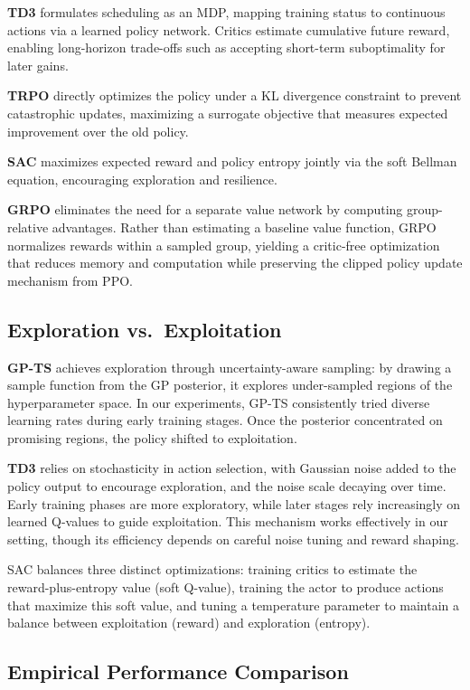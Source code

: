 \documentclass[11pt]{article}
\begin{document}
\textbf{TD3} formulates scheduling as an MDP, mapping training status to continuous actions via a learned policy network. Critics estimate cumulative future reward, enabling long-horizon trade-offs such as accepting short-term suboptimality for later gains.

\textbf{TRPO} directly optimizes the policy under a KL divergence constraint to prevent catastrophic updates, maximizing a surrogate objective that measures expected improvement over the old policy.

\textbf{SAC} maximizes expected reward and policy entropy jointly via the soft Bellman equation, encouraging exploration and resilience.

\textbf{GRPO} eliminates the need for a separate value network by computing group-relative advantages. Rather than estimating a baseline value function, GRPO normalizes rewards within a sampled group, yielding a critic-free optimization that reduces memory and computation while preserving the clipped policy update mechanism from PPO.

\subsection{Exploration vs.\ Exploitation}

\textbf{GP-TS} achieves exploration through uncertainty-aware sampling: by drawing a sample function from the GP posterior, it explores under-sampled regions of the hyperparameter space. In our experiments, GP-TS consistently tried diverse learning rates during early training stages. Once the posterior concentrated on promising regions, the policy shifted to exploitation.

\textbf{TD3} relies on stochasticity in action selection, with Gaussian noise added to the policy output to encourage exploration, and the noise scale decaying over time. Early training phases are more exploratory, while later stages rely increasingly on learned Q-values to guide exploitation. This mechanism works effectively in our setting, though its efficiency depends on careful noise tuning and reward shaping.

SAC balances three distinct optimizations: training critics to estimate the reward-plus-entropy value (soft Q-value), training the actor to produce actions that maximize this soft value, and tuning a temperature parameter to maintain a balance between exploitation (reward) and exploration (entropy).

\subsection{Empirical Performance Comparison}
\end{document}
